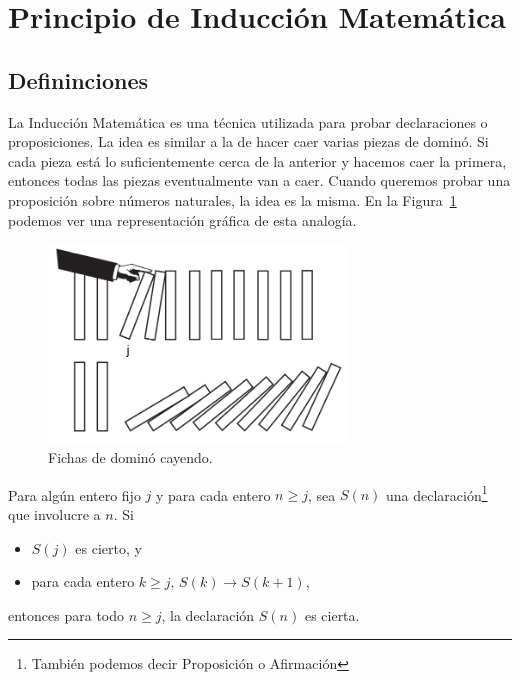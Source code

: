 \newpage
\section{Principio de Inducción Matemática}\label{mathematical-induction}

\subsection{Defininciones}

La Inducción Matemática es una técnica utilizada para probar declaraciones o proposiciones.
La idea es similar a la de hacer caer varias piezas de dominó.
Si cada pieza está lo suficientemente cerca de la anterior y hacemos caer la primera, entonces todas las piezas eventualmente van a caer.
Cuando queremos probar una proposición sobre números naturales, la idea es la misma.
En la Figura~\ref{fig:figure} podemos ver una representación gráfica de esta analogía.

\begin{figure}[htb]
    \centering
    \includegraphics[width=8cm]{images/dominoes-fall}
    \caption{Fichas de dominó cayendo.}
    \label{fig:figure}
\end{figure}

\begin{section-theorem.tcb}
    Para algún entero fijo $j$ y para cada entero $n \geq j$, sea $S(n)$ una declaración\footnote{También podemos decir Proposición o Afirmación} que involucre a $n$. Si
    \begin{itemize}
        \item $S(j)$ es cierto, y
        \item para cada entero $k \geq j$, $S(k) \rightarrow S(k + 1)$,
    \end{itemize}
    entonces para todo $n \geq j$, la declaración $S(n)$ es cierta.
\end{section-theorem.tcb}

